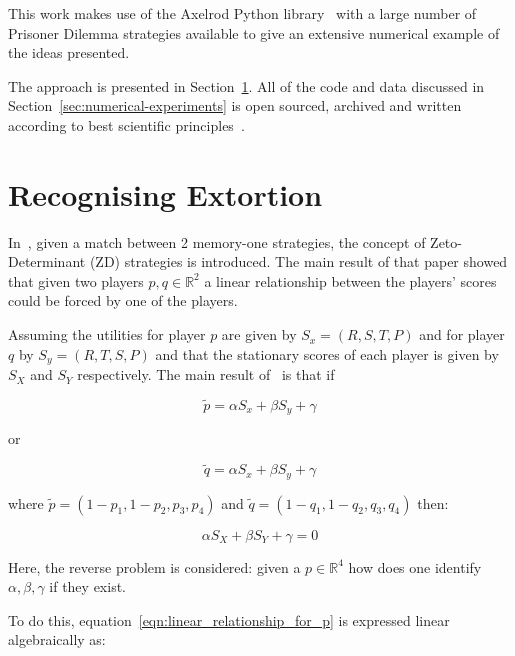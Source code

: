 \documentclass[a4paper]{article}
\begin{document}
This work makes use of the Axelrod Python library~\cite{Knight2018, Knight2016}
with a large number of Prisoner Dilemma strategies available to give an
extensive numerical example of the ideas presented.

The approach is presented in Section~\ref{sec:delta-zd-strategies}.
All of the code and data discussed in Section~\ref{sec:numerical-experiments} is
open sourced, archived and written according to best scientific
principles~\cite{Wilson2014}.

\section{Recognising Extortion}\label{sec:delta-zd-strategies}

In~\cite{Press2012}, given a match between 2 memory-one strategies, the
concept of Zeto-Determinant (ZD) strategies is introduced. The main result of
that paper showed that given two players \(p, q\in\mathbb{R}^2\) a linear
relationship between the players' scores could be forced by one of the players.

Assuming the utilities for player \(p\) are given by \(S_x=(R, S, T, P)\) and
for player \(q\) by \(S_y=(R, T, S, P)\) and that the stationary scores of each
player is given by \(S_X\) and \(S_Y\) respectively. The main result
of~\cite{Press2012} is that if

\begin{equation}\label{eqn:linear_relationship_for_p}
    \tilde p=\alpha S_x + \beta S_y + \gamma
\end{equation}

or

\begin{equation}\label{eqn:linear_relationship_for_q}
    \tilde q=\alpha S_x + \beta S_y + \gamma
\end{equation}

where \(\tilde p = (1 - p_1, 1 - p_2, p_3, p_4)\) and
\(\tilde q = (1 - q_1, 1 - q_2, q_3, q_4)\) then:

\begin{equation}
    \alpha S_X + \beta S_Y + \gamma = 0
\end{equation}

Here, the reverse problem is considered: given a
\(p\in\mathbb{R}^4\) how does one identify \(\alpha, \beta, \gamma\) if they
exist.

To do this, equation~\ref{eqn:linear_relationship_for_p} is expressed linear
algebraically as:
\end{document}
